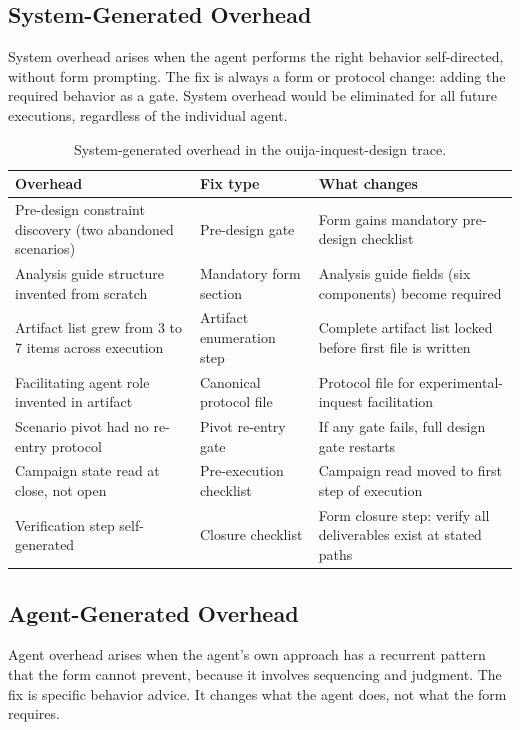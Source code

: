 \documentclass[11pt,a4paper]{article}
\begin{document}
\subsection{System-Generated Overhead}

System overhead arises when the agent performs the right behavior self-directed,
without form prompting. The fix is always a form or protocol change: adding the
required behavior as a gate. System overhead would be eliminated for all future
executions, regardless of the individual agent.

\begin{table}[h]
\centering
\small
\caption{System-generated overhead in the ouija-inquest-design trace.}
\label{tab:sysoverhead}
\begin{tabular}{@{}p{3.8cm}p{2.8cm}p{6cm}@{}}
\toprule
Overhead & Fix type & What changes \\
\midrule
Pre-design constraint discovery (two abandoned scenarios) & Pre-design gate & Form gains mandatory pre-design checklist \\[3pt]
Analysis guide structure invented from scratch & Mandatory form section & Analysis guide fields (six components) become required \\[3pt]
Artifact list grew from 3 to 7 items across execution & Artifact enumeration step & Complete artifact list locked before first file is written \\[3pt]
Facilitating agent role invented in artifact & Canonical protocol file & Protocol file for experimental-inquest facilitation \\[3pt]
Scenario pivot had no re-entry protocol & Pivot re-entry gate & If any gate fails, full design gate restarts \\[3pt]
Campaign state read at close, not open & Pre-execution checklist & Campaign read moved to first step of execution \\[3pt]
Verification step self-generated & Closure checklist & Form closure step: verify all deliverables exist at stated paths \\
\bottomrule
\end{tabular}
\end{table}

\subsection{Agent-Generated Overhead}

Agent overhead arises when the agent's own approach has a recurrent pattern
that the form cannot prevent, because it involves sequencing and judgment. The
fix is specific behavior advice. It changes what the agent does, not what the
form requires.
\end{document}
